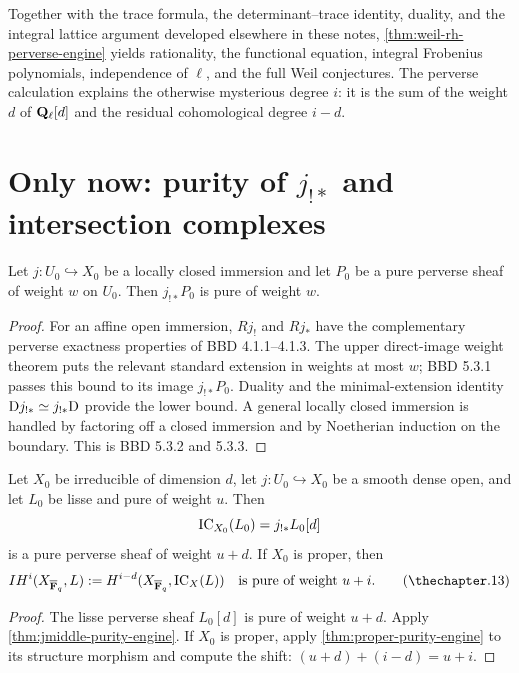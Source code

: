 Together with the trace formula, the determinant--trace identity, duality,
and the integral lattice argument developed elsewhere in these notes,
\cref{thm:weil-rh-perverse-engine} yields rationality, the functional
equation, integral Frobenius polynomials, independence of \(\ell\), and the
full Weil conjectures.  The perverse calculation explains the otherwise
mysterious degree \(i\): it is the sum of the weight \(d\) of
\(\mathbf Q_\ell[d]\) and the residual cohomological degree \(i-d\).

\section{Only now: purity of \texorpdfstring{\(j_{!*}\)}{middle extension} and intersection complexes}

\begin{theorem}
\label{thm:jmiddle-purity-engine}
Let \(j:U_0\hookrightarrow X_0\) be a locally closed immersion and let
\(P_0\) be a pure perverse sheaf of weight \(w\) on \(U_0\).  Then
\(j_{!*}P_0\) is pure of weight \(w\).
\end{theorem}

\begin{proof}
For an affine open immersion, \(Rj_!\) and \(Rj_*\) have the complementary
perverse exactness properties of BBD 4.1.1--4.1.3.  The upper direct-image
weight theorem puts the relevant standard extension in weights at most
\(w\); BBD 5.3.1 passes this bound to its image \(j_{!*}P_0\).  Duality and
the minimal-extension identity
\(\mathrm D j_{!*}\simeq j_{!*}\mathrm D\) provide the lower bound.  A general locally
closed immersion is handled by factoring off a closed immersion and by
Noetherian induction on the boundary.  This is BBD 5.3.2 and 5.3.3.
\end{proof}

\begin{theorem}
\label{thm:ic-purity-engine}
Let \(X_0\) be irreducible of dimension \(d\), let
\(j:U_0\hookrightarrow X_0\) be a smooth dense open, and let \(L_0\) be
lisse and pure of weight \(u\).  Then
\[
  \operatorname{IC}_{X_0}(L_0)=j_{!*}L_0[d]
\]
is a pure perverse sheaf of weight \(u+d\).  If \(X_0\) is proper, then
\[
  IH^i(X_{\Fbar},L)
    :=H^{i-d}(X_{\Fbar},\IC_X(L))
  \quad\text{is pure of weight }u+i.
\tag{\thechapter.13}\label{eq:intersection-purity-engine}
\]
\end{theorem}

\begin{proof}
The lisse perverse sheaf \(L_0[d]\) is pure of weight \(u+d\).  Apply
\cref{thm:jmiddle-purity-engine}.  If \(X_0\) is proper, apply
\cref{thm:proper-purity-engine} to its structure morphism and compute the
shift:
\((u+d)+(i-d)=u+i\).
\end{proof}

